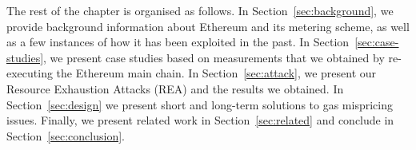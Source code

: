  The rest of the chapter is organised as follows.
In Section~\ref{sec:background}, we provide background information about Ethereum and its metering scheme, as well as a few instances of how it has been exploited in the past.
In Section~\ref{sec:case-studies}, we present case studies based on measurements that we obtained by re-executing the Ethereum main chain.
In Section~\ref{sec:attack}, we present our Resource Exhaustion Attacks (REA) and the results we obtained. In Section~\ref{sec:design} we present short and long-term solutions to gas mispricing issues.
Finally, we present related work in Section~\ref{sec:related} and conclude in Section~\ref{sec:conclusion}.
